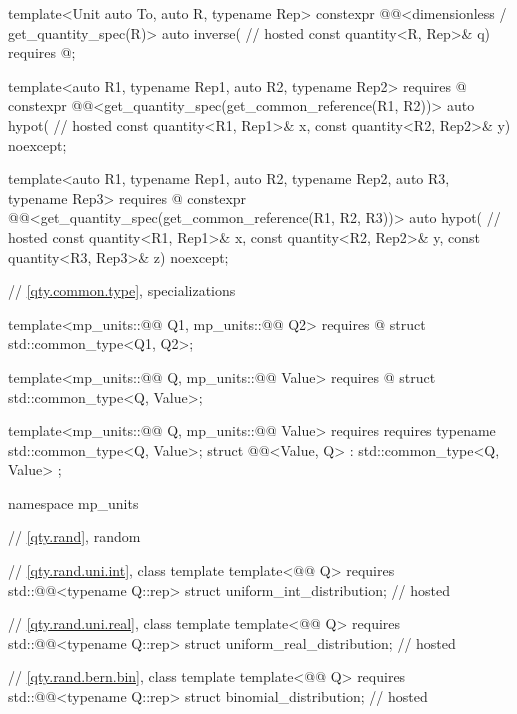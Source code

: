 \begin{codeblock}
{template<Unit auto To, auto R, typename Rep>
constexpr @@<dimensionless / get_quantity_spec(R)> auto inverse(                // hosted
  const quantity<R, Rep>& q)
  requires @\seebelownc@;

template<auto R1, typename Rep1, auto R2, typename Rep2>
  requires @\seebelownc@
constexpr @@<get_quantity_spec(get_common_reference(R1, R2))> auto hypot(       // hosted
  const quantity<R1, Rep1>& x, const quantity<R2, Rep2>& y) noexcept;

template<auto R1, typename Rep1, auto R2, typename Rep2, auto R3, typename Rep3>
  requires @\seebelownc@
constexpr @@<get_quantity_spec(get_common_reference(R1, R2, R3))> auto hypot(   // hosted
  const quantity<R1, Rep1>& x, const quantity<R2, Rep2>& y,
  const quantity<R3, Rep3>& z) noexcept;

}

// \ref{qty.common.type},  specializations

template<mp_units::@@ Q1, mp_units::@@ Q2>
  requires @\seebelownc@
struct std::common_type<Q1, Q2>;

template<mp_units::@@ Q, mp_units::@@ Value>
  requires @\seebelownc@
struct std::common_type<Q, Value>;

template<mp_units::@@ Q, mp_units::@@ Value>
  requires requires { typename std::common_type<Q, Value>; }
struct @@<Value, Q> : std::common_type<Q, Value> {};

namespace mp_units {

// \ref{qty.rand}, random

// \ref{qty.rand.uni.int}, class template 
template<@@ Q>
  requires std::@@<typename Q::rep>
struct uniform_int_distribution;                                                        // hosted

// \ref{qty.rand.uni.real}, class template 
template<@@ Q>
  requires std::@@<typename Q::rep>
struct uniform_real_distribution;                                                       // hosted

// \ref{qty.rand.bern.bin}, class template 
template<@@ Q>
  requires std::@@<typename Q::rep>
struct binomial_distribution;                                                           // hosted

}
\end{codeblock}
